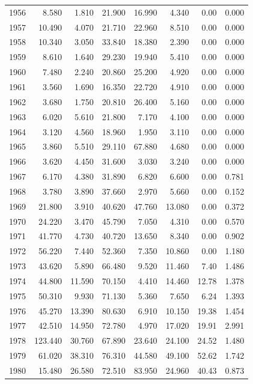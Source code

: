 \documentclass[
]{scrartcl}
\begin{document}
\begin{longtable}{rrrrrrrr}
1956 & 8.580 & 1.810 & 21.900 & 16.990 & 4.340 & 0.00 & 0.000 \\ 
1957 & 10.490 & 4.070 & 21.710 & 22.960 & 8.510 & 0.00 & 0.000 \\ 
1958 & 10.340 & 3.050 & 33.840 & 18.380 & 2.390 & 0.00 & 0.000 \\ 
1959 & 8.610 & 1.640 & 29.230 & 19.940 & 5.410 & 0.00 & 0.000 \\ 
1960 & 7.480 & 2.240 & 20.860 & 25.200 & 4.920 & 0.00 & 0.000 \\ 
1961 & 3.560 & 1.690 & 16.350 & 22.720 & 4.910 & 0.00 & 0.000 \\ 
1962 & 3.680 & 1.750 & 20.810 & 26.400 & 5.160 & 0.00 & 0.000 \\ 
1963 & 6.020 & 5.610 & 21.800 & 7.170 & 4.100 & 0.00 & 0.000 \\ 
1964 & 3.120 & 4.560 & 18.960 & 1.950 & 3.110 & 0.00 & 0.000 \\ 
1965 & 3.860 & 5.510 & 29.110 & 67.880 & 4.680 & 0.00 & 0.000 \\ 
1966 & 3.620 & 4.450 & 31.600 & 3.030 & 3.240 & 0.00 & 0.000 \\ 
1967 & 6.170 & 4.380 & 31.890 & 6.820 & 6.600 & 0.00 & 0.781 \\ 
1968 & 3.780 & 3.890 & 37.660 & 2.970 & 5.660 & 0.00 & 0.152 \\ 
1969 & 21.800 & 3.910 & 40.620 & 47.760 & 13.080 & 0.00 & 0.372 \\ 
1970 & 24.220 & 3.470 & 45.790 & 7.050 & 4.310 & 0.00 & 0.570 \\ 
1971 & 41.770 & 4.730 & 40.720 & 13.650 & 8.340 & 0.00 & 0.902 \\ 
1972 & 56.220 & 7.440 & 52.360 & 7.350 & 10.860 & 0.00 & 1.180 \\ 
1973 & 43.620 & 5.890 & 66.480 & 9.520 & 11.460 & 7.40 & 1.486 \\ 
1974 & 44.800 & 11.590 & 70.150 & 4.410 & 14.460 & 12.78 & 1.378 \\ 
1975 & 50.310 & 9.930 & 71.130 & 5.360 & 7.650 & 6.24 & 1.393 \\ 
1976 & 45.270 & 13.390 & 80.630 & 6.910 & 10.150 & 19.38 & 1.454 \\ 
1977 & 42.510 & 14.950 & 72.780 & 4.970 & 17.020 & 19.91 & 2.991 \\ 
1978 & 123.440 & 30.760 & 67.890 & 23.640 & 24.100 & 24.52 & 1.480 \\ 
1979 & 61.020 & 38.310 & 76.310 & 44.580 & 49.100 & 52.62 & 1.742 \\ 
1980 & 15.480 & 26.580 & 72.510 & 83.950 & 24.960 & 40.43 & 0.873 \\ 

\end{longtable}
\end{document}
